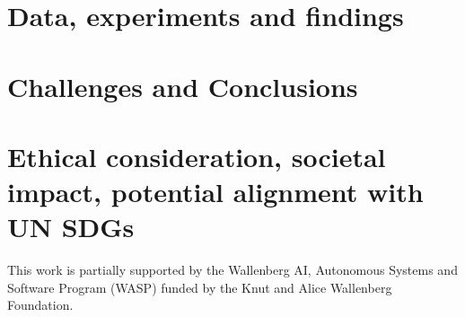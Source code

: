 \documentclass[12pt]{article}
\newcommand{\contentdescription}[1]{}
\begin{document}
    \section{Data, experiments and findings}
    \contentdescription{
        Data, experiments and findings (30-40\%):

        Describe the data you are working with for your project. What type of data is it? Where did it come from? How much data are you working with? Did you have to do any preprocessing, filtering, or other special treatment to use this data in your project?
        Describe and present the experiments that you performed and what is the reason for those experiments. Where applicable define evaluation metrics that you used. Discuss the results that you got.
    }


    \section{Challenges and Conclusions}
    \contentdescription{
        Challenges and Conclusions (5-15\%):
        Challenges you faced when reimplementing the paper and conducting the experiments. Were all details in the paper? Or did you have to look in the authors code or even contact them to find about some details? Was parts of the code quite hard to get them to work as intended? Did you have optimize and tune several hyperparameters? Which ones? Did the framework you used make the implementation difficult in some ways?

        Summarize your key results - what have you learned? What points do you think one should consider when using the approach of the paper you chose for your project? Suggest ideas for future extensions or new applications of your ideas.
    }


    \section{Ethical consideration, societal impact, potential alignment with UN SDGs}
    \contentdescription{
        Ethical consideration, societal impact, potential alignment with UN SDGs (5-10\%): Think and research! Are there any ethical considerations for the original paper, its problem or method, its way of conducting experiments? How about your task, your datasets, and the experiments you did? What societal impact can you imagine about the original paper and its contributions and results? How about your project report? How do you think this paper can push the UN SDG targets?
    }

    \begin{ack}
        This work is partially supported by the Wallenberg AI, Autonomous Systems and Software Program (WASP) funded by the Knut and Alice Wallenberg Foundation.
    \end{ack}

    

    
\end{document}
